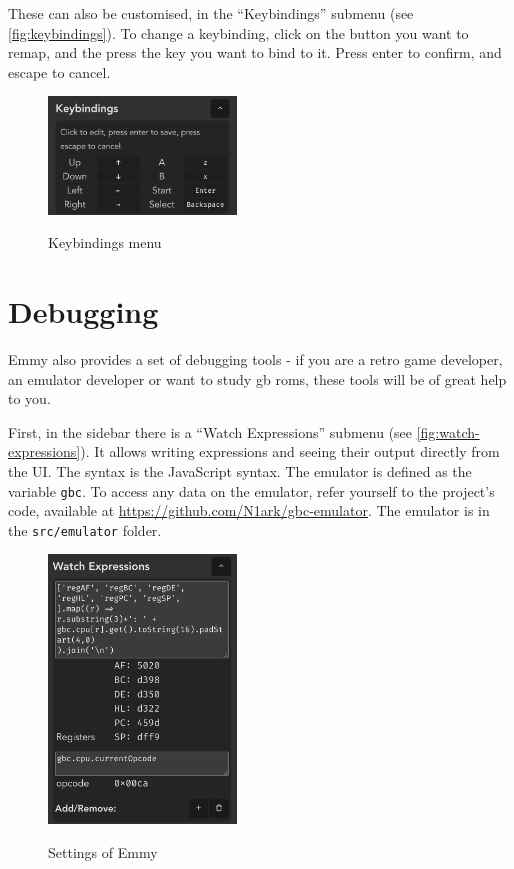 These can also be customised, in the ``Keybindings'' submenu (see \autoref{fig:keybindings}). To change a keybinding, click on the button you want to remap, and the press the key you want to bind to it. Press enter to confirm, and escape to cancel.

\begin{figure}[h]
    \centering
    \includegraphics[width=5cm]{images/keybindings}\\
    \caption{Keybindings menu}
    \label{fig:keybindings}
\end{figure}

\section{Debugging}

Emmy also provides a set of debugging tools - if you are a retro game developer, an emulator developer or want to study \glsdesc{gb} \glspl{rom}, these tools will be of great help to you.

First, in the sidebar there is a ``Watch Expressions'' submenu (see \autoref{fig:watch-expressions}). It allows writing expressions and seeing their output directly from the UI. The syntax is the JavaScript syntax. The emulator is defined as the variable \texttt{gbc}. To access any data on the emulator, refer yourself to the project's code, available at \url{https://github.com/N1ark/gbc-emulator}. The emulator is in the \texttt{src/emulator} folder.

\begin{figure}[h]
    \centering
    \includegraphics[width=5cm]{images/watch-expressions}\\
    \caption{Settings of Emmy}
    \label{fig:watch-expressions}
\end{figure}

